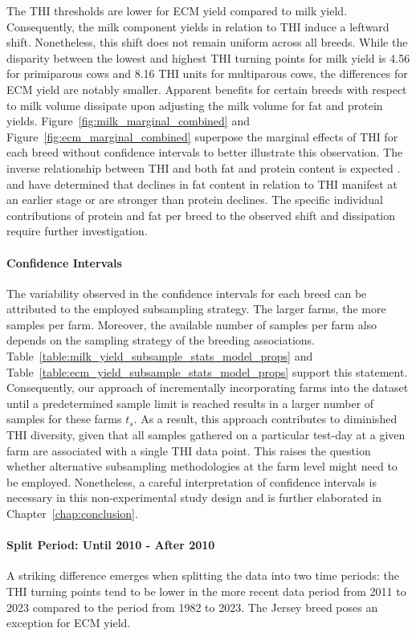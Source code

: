 The THI thresholds are lower for ECM yield compared to milk yield. Consequently, the milk component yields in relation to THI induce a leftward shift. Nonetheless, this shift does not remain uniform across all breeds. While the disparity between the lowest and highest THI turning points for milk yield is 4.56 for primiparous cows and 8.16 THI units for multiparous cows, the differences for ECM yield are notably smaller. Apparent benefits for certain breeds with respect to milk volume dissipate upon adjusting the milk volume for fat and protein yields. Figure~\ref{fig:milk_marginal_combined} and Figure~\ref{fig:ecm_marginal_combined} superpose the marginal effects of THI for each breed without confidence intervals to better illustrate this observation. The inverse relationship between THI and both fat and protein content is expected \citep{moore_how_2023}. \cite{vinet_estimation_2023} and \cite{hill_dairy_2015} have determined that declines in fat content in relation to THI manifest at an earlier stage or are stronger than protein declines. The specific individual contributions of protein and fat per breed to the observed shift and dissipation require further investigation.


\paragraph{Confidence Intervals}
The variability observed in the confidence intervals for each breed can be attributed to the employed subsampling strategy. The larger farms, the more samples per farm. Moreover, the available number of samples per farm also depends on the sampling strategy of the breeding associations. Table~\ref{table:milk_yield_subsample_stats_model_props} and Table~\ref{table:ecm_yield_subsample_stats_model_props} support this statement.  Consequently, our approach of incrementally incorporating farms into the dataset until a predetermined sample limit is reached results in a larger number of samples for these farms $t_s$. As a result, this approach contributes to diminished THI diversity, given that all samples gathered on a particular test-day at a given farm are associated with a single THI data point. This raises the question whether alternative subsampling methodologies at the farm level might need to be employed. Nonetheless, a careful interpretation of confidence intervals is necessary in this non-experimental study design and is further elaborated in Chapter~\ref{chap:conclusion}.

\paragraph{Split Period: Until 2010 - After 2010}
A striking difference emerges when splitting the data into two time periods: the THI turning points tend to be lower in the more recent data period from 2011 to 2023 compared to the period from 1982 to 2023. The Jersey breed poses an exception for ECM yield.

